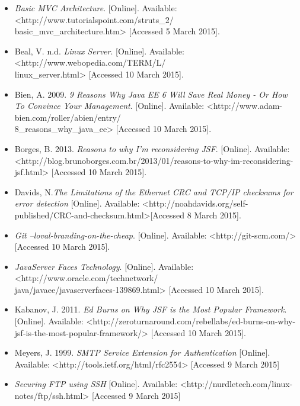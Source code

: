 \documentclass[a4paper,12pt]{article}
\begin{document}
		\begin{itemize}
			\item \textit{Basic MVC Architecture}. [Online]. Available: <http://www.tutorialspoint.com/struts\_2/\\basic\_mvc\_architecture.htm> [Accessed 5 March 2015].
			
			\item Beal, V. n.d. \textit{Linux Server}. [Online]. Available: <http://www.webopedia.com/TERM/L/\\linux\_server.html> [Accessed 10 March 2015].

			\item Bien, A. 2009. \textit{9 Reasons Why Java EE 6 Will Save Real Money - Or How To Convince Your Management}. [Online]. Available: <http://www.adam-bien.com/roller/abien/entry/\\8\_reasons\_why\_java\_ee> [Accessed 10 March 2015].

			\item Borges, B. 2013. \textit{Reasons to why I'm reconsidering JSF}. [Online]. Available: <http://blog.brunoborges.com.br/2013/01/reasons-to-why-im-reconsidering-jsf.html> [Accessed 10 March 2015].
			
			\item Davids, N.\textit{The Limitations of the Ethernet CRC and TCP/IP checksums for error detection} [Online]. Available: 
			<http://noahdavids.org/self-published/CRC-and-checksum.html>[Accessed 8 March 2015].

			\item \textit{Git --loval-branding-on-the-cheap}. [Online]. Available: <http://git-scm.com/> [Accessed 10 March 2015].

			\item \textit{JavaServer Faces Technology}. [Online]. Available: <http://www.oracle.com/technetwork/\\java/javaee/javaserverfaces-139869.html> [Accessed 10 March 2015].

			\item Kabanov, J. 2011. \textit{Ed Burns on Why JSF is the Most Popular Framework}. [Online]. Available: <http://zeroturnaround.com/rebellabs/ed-burns-on-why-jsf-is-the-most-popular-framework/> [Accessed 10 March 2015].
			\item Meyers, J. 1999. \textit{SMTP Service Extension for Authentication} [Online]. Available: <http://tools.ietf.org/html/rfc2554> [Accessed 9 March 2015]

			\item \textit{Securing FTP using SSH} [Online]. Available: <http://nurdletech.com/linux-notes/ftp/ssh.html> [Accessed 9 March 2015]


\end{itemize}
\end{document}
